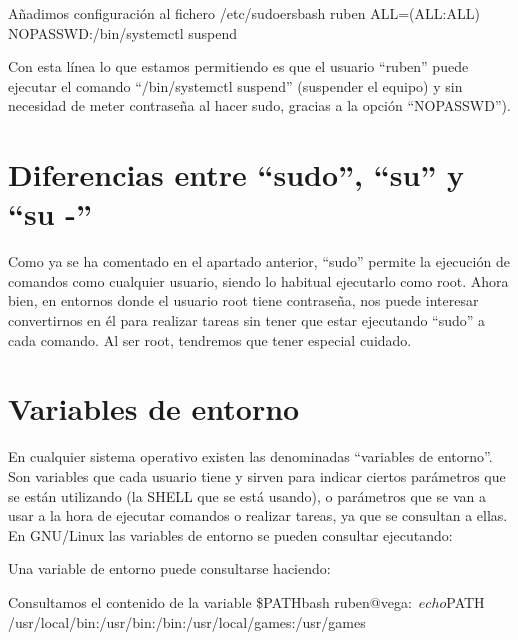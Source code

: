 \documentclass{../../../yukibook.cls/yukibook}
\begin{document}
\begin{mycode}{Añadimos configuración al fichero \faFile \hspace{1pt} /etc/sudoers}{bash}{}
ruben    ALL=(ALL:ALL) NOPASSWD:/bin/systemctl suspend
\end{mycode}

Con esta línea lo que estamos permitiendo es que el usuario “ruben” puede ejecutar el comando “/bin/systemctl suspend” (suspender el equipo) y sin necesidad de meter contraseña al hacer sudo, gracias a la opción “NOPASSWD”).

\section{Diferencias entre “sudo”, “su” y “su -”}
Como ya se ha comentado en el apartado anterior, “sudo” permite la ejecución de comandos como cualquier usuario, siendo lo habitual ejecutarlo como root. Ahora bien, en entornos donde el usuario root tiene contraseña, nos puede interesar convertirnos en él para realizar tareas sin tener que estar ejecutando “sudo” a cada comando. Al ser root, tendremos que tener especial cuidado.

\section{Variables de entorno}
En cualquier sistema operativo existen las denominadas “variables de entorno”. Son variables que cada usuario tiene y sirven para indicar ciertos parámetros que se están utilizando (la SHELL que se está usando), o parámetros que se van a usar a la hora de ejecutar comandos o realizar tareas, ya que se consultan a ellas. En GNU/Linux las variables de entorno se pueden consultar ejecutando:


Una variable de entorno puede consultarse haciendo:

\begin{mycode}{Consultamos el contenido de la variable \$PATH}{bash}{}
ruben@vega:~$ echo $PATH
/usr/local/bin:/usr/bin:/bin:/usr/local/games:/usr/games

\end{mycode}
\end{document}
